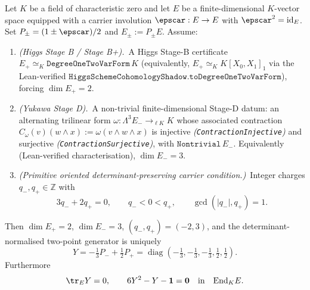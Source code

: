 \begin{theorem}
\label{thm:carrier-rigidity}
Let $K$ be a field of characteristic zero and let $E$ be a finite-dimensional $K$-vector space
equipped with a carrier involution $\epscar : E \to E$ with $\epscar^2 = \mathrm{id}_E$. Set
$P_\pm = (1 \pm \epscar)/2$ and $E_\pm := P_\pm E$. Assume:
\begin{enumerate}[label=(\roman*), leftmargin=1.7em]
    \item \emph{(Higgs Stage B / Stage B+).}\ A Higgs Stage-B
        certificate $E_+ \simeq_K \texttt{DegreeOneTwoVarForm}\,K$
        (equivalently, $E_+ \simeq_K K[X_0, X_1]_1$ via the
        Lean-verified
        $\texttt{HiggsSchemeCohomologyShadow.toDegreeOneTwoVarForm}$),
        forcing $\dim E_+ = 2$.
    \item \emph{(Yukawa Stage D).}\ A non-trivial finite-dimensional
        Stage-D datum: an alternating trilinear form
        $\omega : \Lambda^3 E_- \to_{\ell K} K$ whose associated
        contraction
        $C_\omega(v)(w \wedge x) := \omega(v \wedge w \wedge x)$ is
        injective \emph{(\texttt{ContractionInjective})} and
        surjective \emph{(\texttt{ContractionSurjective})}, with
        $\texttt{Nontrivial}\,E_-$.
        Equivalently (Lean-verified characterisation), $\dim E_- = 3$.
    \item \emph{(Primitive oriented determinant-preserving carrier
        condition.)}\ Integer charges $q_-, q_+ \in \mathbb Z$ with
        \[
        3 q_- + 2 q_+ = 0,
        \qquad
        q_- < 0 < q_+,
        \qquad
        \gcd(|q_-|, q_+) = 1.
        \]
\end{enumerate}
Then $\dim E_+ = 2$, $\dim E_- = 3$, $(q_-, q_+) = (-2, 3)$, and the
determinant-normalised two-point generator is uniquely
\[
Y = -\tfrac13 P_- + \tfrac12 P_+
  = \operatorname{diag}\!\left(-\tfrac13,-\tfrac13,-\tfrac13,\tfrac12,\tfrac12\right).
\]
Furthermore
\[
\tr_E Y = 0,
\qquad
6 Y^2 - Y - \mathbf 1 = \mathbf 0
\quad\text{in}\quad
\mathrm{End}_K E.
\]
\end{theorem}


